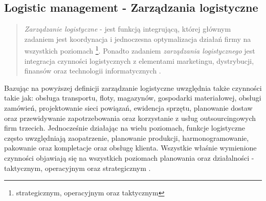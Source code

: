 	\subsection{Logistic management - Zarządzania logistyczne}
		\begin{quote}
			\emph{Zarządzanie logistyczne} - jest funkcją integrującą, której głównym zadaniem jest
			koordynacja i jednoczesna optymalizacja działań firmy na wszystkich poziomach
			\footnote{strategicznym, operacyjnym oraz taktycznym}. Ponadto zadaniem \emph{zarządzania logistycznego} jest
			integracja czynności logistycznych z elementami marketingu, dystrybucji, finansów oraz technologii
			informatycznych	\cite{csmp_logistic_management}. 
		\end{quote}
		Bazując na powyższej definicji zarządzanie logistyczne uwzględnia także czynności takie jak:
		obsługa transportu, floty, magazynów, gospodarki materiałowej, obsługi zamówień, 
		projektowanie sieci powiązań, ewidencja sprzętu,
		planowanie dostaw oraz przewidywanie zapotrzebowania oraz korzystanie z 
		usług outsourcingowych firm trzecich. Jednocześnie działając na wielu poziomach, 
		funkcje logistyczne często uwzględniają zaopatrzenie, planowanie produkcji, harmonogramowanie, 
		pakowanie oraz kompletacje oraz obsługę klienta. Wszystkie właśnie wymienione czynności
		objawiają się na wszystkich poziomach planowania oraz działalności - taktycznym, operacyjnym oraz
		strategicznym \cite{csmp_logistic_management}.

